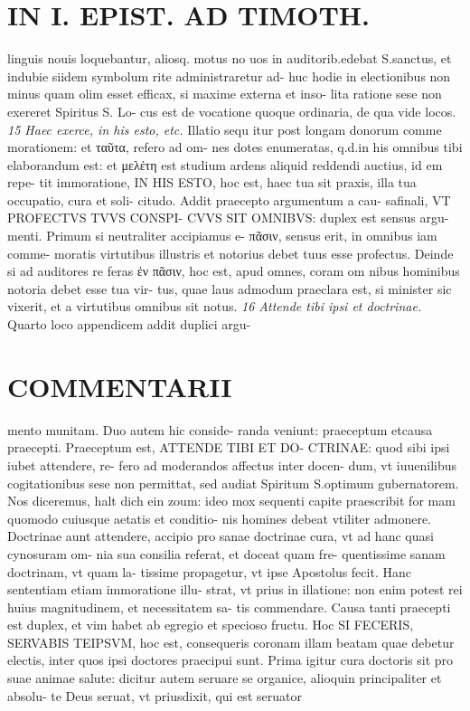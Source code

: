 \documentclass{article}
\begin{document}
\begin{pages}
\section*{IN I. EPIST. AD TIMOTH. }
\marginpar{[ p.113 ]}\pstart linguis nouis loquebantur, aliosq. motus no uos in auditorib.edebat S.sanctus, et indubie siidem symbolum rite administraretur ad- huc hodie in electionibus non minus quam olim esset efficax, si maxime externa et inso- lita ratione sese non exereret Spiritus S. Lo- cus est de vocatione quoque ordinaria, de qua vide locos.  \pend
\textit{15 Haec exerce, in his esto, etc. }\pstart Illatio sequ itur post longam donorum comme morationem: et ταῦτα, refero ad om- nes dotes enumeratas, q.d.in his omnibus tibi elaborandum est: et μελέτη est studium ardens aliquid reddendi auctius, id em repe- tit immoratione, IN HIS ESTO, hoc est, haec tua sit praxis, illa tua occupatio, cura et soli- citudo. Addit praecepto argumentum a cau- safinali, VT PROFECTVS TVVS CONSPI- CVVS SIT OMNIBVS: duplex est sensus argu- menti. Primum si neutraliter accipiamus e- πᾶσιν, sensus erit, in omnibus iam comme- moratis virtutibus illustris et notorius debet tuus esse profectus. Deinde si ad auditores re feras ἐν πᾶσιν, hoc est, apud omnes, coram om nibus hominibus notoria debet esse tua vir- tus, quae laus admodum praeclara est, si minister sic vixerit, et a virtutibus omnibus sit notus.  \pend
\textit{16 Attende tibi ipsi et doctrinae. }\pstart Quarto loco appendicem addit duplici argu-  \pend
\section*{COMMENTARII }
\marginpar{[ p.114 ]}\pstart mento munitam. Duo autem hic conside- randa veniunt: praeceptum etcausa praecepti. Praeceptum est, ATTENDE TIBI ET DO- CTRINAE: quod sibi ipsi iubet attendere, re- fero ad moderandos affectus inter docen- dum, vt iuuenilibus cogitationibus sese non permittat, sed audiat Spiritum S.optimum gubernatorem. Nos diceremus, halt dich ein zoum: ideo mox sequenti capite praescribit for mam quomodo cuiusque aetatis et conditio- nis homines debeat vtiliter admonere.  \pend\pstart Doctrinae aunt attendere, accipio pro sanae doctrinae cura, vt ad hanc quasi cynosuram om- nia sua consilia referat, et doceat quam fre- quentissime sanam doctrinam, vt quam la- tissime propagetur, vt ipse Apostolus fecit. Hanc sententiam etiam immoratione illu- strat, vt prius in illatione: non enim potest rei huius magnitudinem, et necessitatem sa- tis commendare.  \pend\pstart Causa tanti praecepti est duplex, et vim habet ab egregio et specioso fructu. Hoc SI FECERIS, SERVABIS TEIPSVM, hoc est, consequeris coronam illam beatam quae debetur electis, inter quos ipsi doctores praecipui sunt. Prima igitur cura doctoris sit pro suae animae salute: dicitur autem seruare se organice, alioquin principaliter et absolu- te Deus seruat, vt priusdixit, qui est seruator  \pend

\end{pages}
\end{document}

